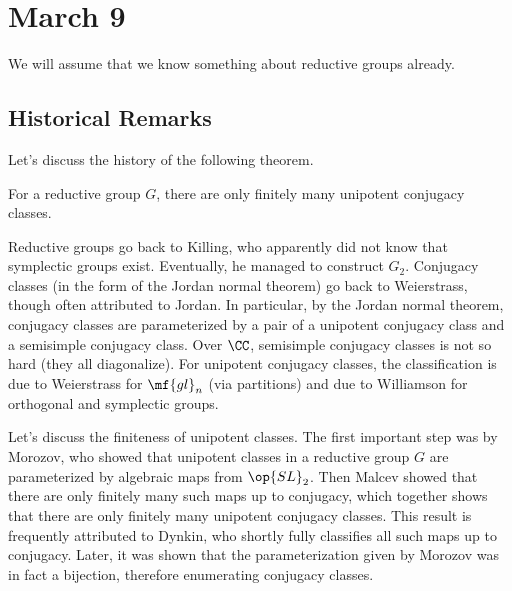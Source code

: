 \documentclass[../notes.tex]{subfiles}
\begin{document}
\section{March 9}
We will assume that we know something about reductive groups already.

\subsection{Historical Remarks}
Let's discuss the history of the following theorem.
\begin{theorem}
	For a reductive group $G$, there are only finitely many unipotent conjugacy classes.
\end{theorem}
Reductive groups go back to Killing, who apparently did not know that symplectic groups exist. Eventually, he managed to construct $G_2$. Conjugacy classes (in the form of the Jordan normal theorem) go back to Weierstrass, though often attributed to Jordan. In particular, by the Jordan normal theorem, conjugacy classes are parameterized by a pair of a unipotent conjugacy class and a semisimple conjugacy class. Over $\CC$, semisimple conjugacy classes is not so hard (they all diagonalize). For unipotent conjugacy classes, the classification is due to Weierstrass for $\mf{gl}_n$ (via partitions) and due to Williamson for orthogonal and symplectic groups.

Let's discuss the finiteness of unipotent classes. The first important step was by Morozov, who showed that unipotent classes in a reductive group $G$ are parameterized by algebraic maps from $\op{SL}_2$. Then Malcev showed that there are only finitely many such maps up to conjugacy, which together shows that there are only finitely many unipotent conjugacy classes. This result is frequently attributed to Dynkin, who shortly fully classifies all such maps up to conjugacy. Later, it was shown that the parameterization given by Morozov was in fact a bijection, therefore enumerating conjugacy classes.
\end{document}
